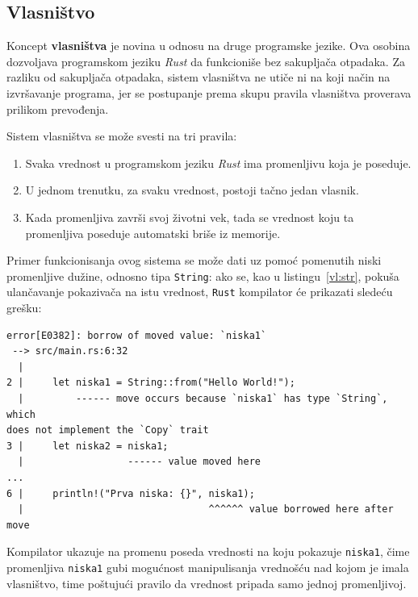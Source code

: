\documentclass[12pt,oneside]{memoir}
\begin{document}




\subsection{Vlasništvo}
Koncept \textbf{vlasništva} je novina u odnosu na druge programske jezike. Ova
osobina dozvoljava programskom jeziku \emph{Rust} da funkcioniše bez sakupljača
otpadaka. Za razliku od sakupljača otpadaka, sistem vlasništva ne utiče ni na
koji način na izvršavanje programa, jer se postupanje prema skupu pravila
vlasništva proverava prilikom prevođenja.

Sistem vlasništva se može svesti na tri pravila:

\begin{enumerate}
  \item Svaka vrednost u programskom jeziku \emph{Rust} ima promenljivu koja
        je poseduje.
  \item U jednom trenutku, za svaku vrednost, postoji tačno jedan vlasnik.
  \item Kada promenljiva završi svoj životni vek, tada se vrednost
        koju ta promenljiva poseduje automatski briše iz memorije.
\end{enumerate}

Primer funkcionisanja ovog sistema se može dati uz pomoć pomenutih niski promenljive dužine,
odnosno tipa \texttt{String}: ako se, kao u listingu~\ref{vl:str}, pokuša
ulančavanje pokazivača na istu vrednost, \texttt{Rust} kompilator će prikazati sledeću grešku:

\begin{lstlisting}[language={}, style=text]
error[E0382]: borrow of moved value: `niska1`
 --> src/main.rs:6:32
  |
2 |     let niska1 = String::from("Hello World!");
  |         ------ move occurs because `niska1` has type `String`, which
does not implement the `Copy` trait
3 |     let niska2 = niska1;
  |                  ------ value moved here
...
6 |     println!("Prva niska: {}", niska1);
  |                                ^^^^^^ value borrowed here after move
\end{lstlisting}

Kompilator ukazuje na promenu poseda vrednosti na koju pokazuje \texttt{niska1}, čime promenljiva
\texttt{niska1} gubi mogućnost manipulisanja vrednošću nad kojom je imala vlasništvo, time poštujući
pravilo da vrednost pripada samo jednoj promenljivoj.
\end{document}
